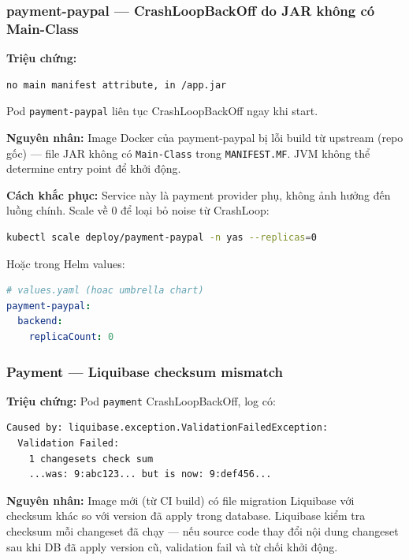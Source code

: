 \subsubsection{payment-paypal — CrashLoopBackOff do JAR không có Main-Class}

\textbf{Triệu chứng:}

\begin{lstlisting}[language=bash]
no main manifest attribute, in /app.jar
\end{lstlisting}

Pod \texttt{payment-paypal} liên tục CrashLoopBackOff ngay khi start.

\textbf{Nguyên nhân:} Image Docker của payment-paypal bị lỗi build từ upstream (repo gốc) — file JAR không có \texttt{Main-Class} trong \texttt{MANIFEST.MF}. JVM không thể determine entry point để khởi động.

\textbf{Cách khắc phục:} Service này là payment provider phụ, không ảnh hưởng đến luồng chính. Scale về 0 để loại bỏ noise từ CrashLoop:

\begin{lstlisting}[language=bash]
kubectl scale deploy/payment-paypal -n yas --replicas=0
\end{lstlisting}

Hoặc trong Helm values:

\begin{lstlisting}[language=yaml]
# values.yaml (hoac umbrella chart)
payment-paypal:
  backend:
    replicaCount: 0
\end{lstlisting}

\subsubsection{Payment — Liquibase checksum mismatch}

\textbf{Triệu chứng:} Pod \texttt{payment} CrashLoopBackOff, log có:

\begin{lstlisting}[language=bash]
Caused by: liquibase.exception.ValidationFailedException:
  Validation Failed:
    1 changesets check sum
    ...was: 9:abc123... but is now: 9:def456...
\end{lstlisting}

\textbf{Nguyên nhân:} Image mới (từ CI build) có file migration Liquibase với checksum khác so với version đã apply trong database. Liquibase kiểm tra checksum mỗi changeset đã chạy — nếu source code thay đổi nội dung changeset sau khi DB đã apply version cũ, validation fail và từ chối khởi động.

